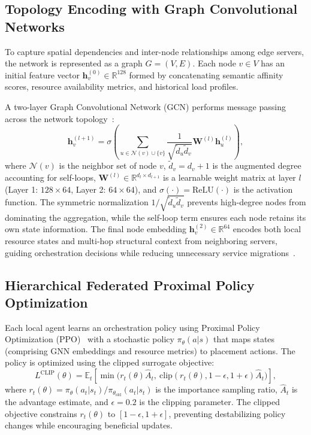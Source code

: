 \documentclass[conference]{IEEEtran}
\begin{document}
		\subsection{Topology Encoding with Graph Convolutional Networks}
		To capture spatial dependencies and inter-node relationships among edge servers, the network is represented as a graph $G = (V, E)$. Each node $v \in V$ has an initial feature vector $\mathbf{h}_v^{(0)} \in \mathbb{R}^{128}$ formed by concatenating semantic affinity scores, resource availability metrics, and historical load profiles.
		
		A two-layer Graph Convolutional Network (GCN) performs message passing across the network topology~\cite{wang2024deepgrl}:
		\begin{equation}
			\mathbf{h}_v^{(l+1)} = \sigma\!\left(\sum_{u \in \mathcal{N}(v) \cup \{v\}} \frac{1}{\sqrt{\tilde{d}_u \tilde{d}_v}} \mathbf{W}^{(l)} \mathbf{h}_u^{(l)}\right),
		\end{equation}
		where $\mathcal{N}(v)$ is the neighbor set of node $v$, $\tilde{d}_v = d_v + 1$ is the augmented degree accounting for self-loops, $\mathbf{W}^{(l)} \in \mathbb{R}^{d_l \times d_{l+1}}$ is a learnable weight matrix at layer $l$ (Layer 1: $128 \times 64$, Layer 2: $64 \times 64$), and $\sigma(\cdot) = \text{ReLU}(\cdot)$ is the activation function. The symmetric normalization $1/\sqrt{\tilde{d}_u \tilde{d}_v}$ prevents high-degree nodes from dominating the aggregation, while the self-loop term ensures each node retains its own state information. The final node embedding $\mathbf{h}_v^{(2)} \in \mathbb{R}^{64}$ encodes both local resource states and multi-hop structural context from neighboring servers, guiding orchestration decisions while reducing unnecessary service migrations~\cite{moreira2024vne}.
		
		
		\subsection{Hierarchical Federated Proximal Policy Optimization}
		Each local agent learns an orchestration policy using Proximal Policy Optimization (PPO)~\cite{robles2023multilayer} with a stochastic policy $\pi_{\theta}(a|s)$ that maps states (comprising GNN embeddings and resource metrics) to placement actions. The policy is optimized using the clipped surrogate objective:
		\begin{equation}
			L^{\text{CLIP}}(\theta) = \mathbb{E}_t\!\left[\min\!\big(r_t(\theta)\hat{A}_t, \ \text{clip}(r_t(\theta), 1-\epsilon, 1+\epsilon)\hat{A}_t\big)\right],
		\end{equation}
		where $r_t(\theta) = \pi_\theta(a_t|s_t)/\pi_{\theta_{\text{old}}}(a_t|s_t)$ is the importance sampling ratio, $\hat{A}_t$ is the advantage estimate, and $\epsilon = 0.2$ is the clipping parameter. The clipped objective constrains $r_t(\theta)$ to $[1-\epsilon, 1+\epsilon]$, preventing destabilizing policy changes while encouraging beneficial updates.
		
\end{document}

